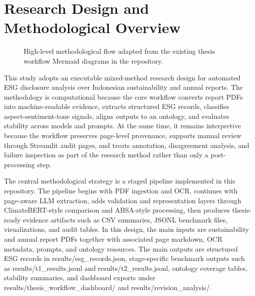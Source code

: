 \section{Research Design and Methodological Overview}

\begin{figure}[ht]
\begin{center}
\end{center}
\caption{High-level methodological flow adapted from the existing thesis workflow Mermaid diagrams in the repository.}
\label{fig:implementation-research-design}
\end{figure}

This study adopts an executable mixed-method research design for automated ESG disclosure analysis over Indonesian sustainability and annual reports. The methodology is computational because the core workflow converts report PDFs into machine-readable evidence, extracts structured ESG records, classifies aspect-sentiment-tone signals, aligns outputs to an ontology, and evaluates stability across models and prompts. At the same time, it remains interpretive because the workflow preserves page-level provenance, supports manual review through Streamlit audit pages, and treats annotation, disagreement analysis, and failure inspection as part of the research method rather than only a post-processing step.

The central methodological strategy is a staged pipeline implemented in this repository. The pipeline begins with PDF ingestion and OCR, continues with page-aware LLM extraction, adds validation and representation layers through ClimateBERT-style comparison and ABSA-style processing, then produces thesis-ready evidence artifacts such as CSV summaries, JSONL benchmark files, visualizations, and audit tables. In this design, the main inputs are sustainability and annual report PDFs together with associated page markdown, OCR metadata, prompts, and ontology resources. The main outputs are structured ESG records in results/esg\_records.json, stage-specific benchmark outputs such as results/t1\_results.jsonl and results/t2\_results.jsonl, ontology coverage tables, stability summaries, and dashboard exports under results/thesis\_workflow\_dashboard/ and results/revision\_analysis/.

